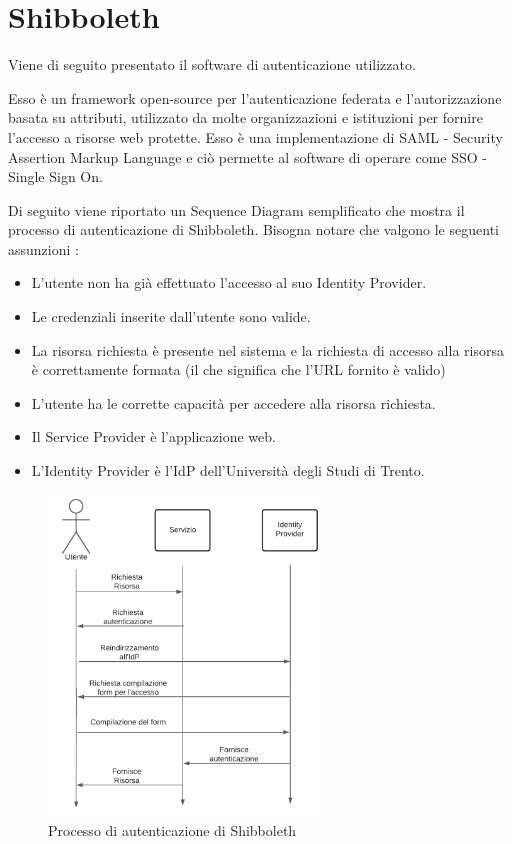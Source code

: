 \section{Shibboleth}
Viene di seguito presentato il software di autenticazione utilizzato. 


Esso è un framework open-source per l'autenticazione federata e l'autorizzazione basata su attributi, utilizzato da molte organizzazioni e istituzioni per fornire l'accesso a risorse web protette. Esso è una implementazione di SAML - Security Assertion Markup Language e ciò permette al software di operare come SSO - Single Sign On. \cite{shibboleth}

Di seguito viene riportato un Sequence Diagram semplificato che mostra il processo di autenticazione di Shibboleth. Bisogna notare che valgono le seguenti assunzioni :
\begin{itemize}
    \item L'utente non ha già effettuato l'accesso al suo Identity Provider.
    \item Le credenziali inserite dall'utente sono valide.
    \item La risorsa richiesta è presente nel sistema e la richiesta di accesso alla risorsa è correttamente formata (il che significa che l'URL fornito è valido)
    \item L'utente ha le corrette capacità per accedere alla risorsa richiesta.
    \item Il Service Provider è l'applicazione web.
    \item L'Identity Provider è l'IdP dell'Università degli Studi di Trento.
\end{itemize}

\begin{figure}[H]
    \begin{center}
        \includegraphics[width=0.65\textwidth]{images/shibboleth_auth.png}
    \end{center}
    \caption{Processo di autenticazione di Shibboleth}
    \label{fig:shibboleth_auth}
\end{figure}


